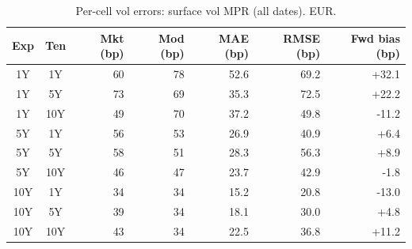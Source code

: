 \begin{table}[H]
\centering
\caption{Per-cell vol errors: surface vol MPR (all dates). EUR.}
\label{tab:surface_vol_mpr_per_cell_all}
\small
\begin{tabular}{@{}ccrrrrr@{}}
\toprule
\textbf{Exp} & \textbf{Ten} & \textbf{Mkt (bp)} & \textbf{Mod (bp)} & \textbf{MAE (bp)} & \textbf{RMSE (bp)} & \textbf{Fwd bias (bp)} \\
\midrule
  1Y & 1Y & 60 & 78 & 52.6 & 69.2 & +32.1 \\
  1Y & 5Y & 73 & 69 & 35.3 & 72.5 & +22.2 \\
  1Y & 10Y & 49 & 70 & 37.2 & 49.8 & -11.2 \\
  \midrule
  5Y & 1Y & 56 & 53 & 26.9 & 40.9 & +6.4 \\
  5Y & 5Y & 58 & 51 & 28.3 & 56.3 & +8.9 \\
  5Y & 10Y & 46 & 47 & 23.7 & 42.9 & -1.8 \\
  \midrule
  10Y & 1Y & 34 & 34 & 15.2 & 20.8 & -13.0 \\
  10Y & 5Y & 39 & 34 & 18.1 & 30.0 & +4.8 \\
  10Y & 10Y & 43 & 34 & 22.5 & 36.8 & +11.2 \\
\bottomrule
\end{tabular}
\end{table}